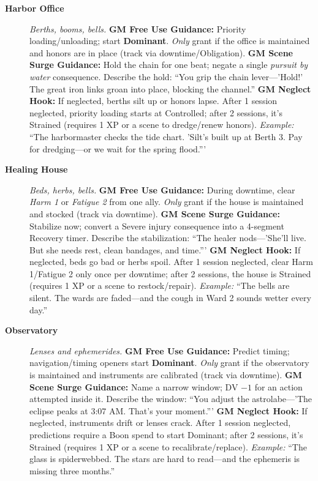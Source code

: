 \begin{description}
  \item[\textbf{Harbor Office}]   
        \emph{Berths, booms, bells.}  
        \textbf{GM Free Use Guidance:} Priority loading/unloading; start \textbf{Dominant}. \emph{Only} grant if the office is maintained and honors are in place (track via downtime/Obligation).  
        \textbf{GM Scene Surge Guidance:} Hold the chain for one beat; negate a single \emph{pursuit by water} consequence. Describe the hold: ``You grip the chain lever---'Hold!' The great iron links groan into place, blocking the channel.''  
        \textbf{GM Neglect Hook:} If neglected, berths silt up or honors lapse. After 1 session neglected, priority loading starts at Controlled; after 2 sessions, it's Strained (requires 1 XP or a scene to dredge/renew honors).  
        \textit{Example:} ``The harbormaster checks the tide chart. 'Silt's built up at Berth 3. Pay for dredging---or we wait for the spring flood.'''  

  \item[\textbf{Healing House}]   
        \emph{Beds, herbs, bells.}  
        \textbf{GM Free Use Guidance:} During downtime, clear \emph{Harm 1} or \emph{Fatigue 2} from one ally. \emph{Only} grant if the house is maintained and stocked (track via downtime).  
        \textbf{GM Scene Surge Guidance:} Stabilize now; convert a Severe injury consequence into a 4-segment Recovery timer. Describe the stabilization: ``The healer nods---'She'll live. But she needs rest, clean bandages, and time.'''  
        \textbf{GM Neglect Hook:} If neglected, beds go bad or herbs spoil. After 1 session neglected, clear Harm 1/Fatigue 2 only once per downtime; after 2 sessions, the house is Strained (requires 1 XP or a scene to restock/repair).  
        \textit{Example:} ``The bells are silent. The wards are faded---and the cough in Ward 2 sounds wetter every day.''  

  \item[\textbf{Observatory}]   
        \emph{Lenses and ephemerides.}  
        \textbf{GM Free Use Guidance:} Predict timing; navigation/timing openers start \textbf{Dominant}. \emph{Only} grant if the observatory is maintained and instruments are calibrated (track via downtime).  
        \textbf{GM Scene Surge Guidance:} Name a narrow window; DV $-1$ for an action attempted inside it. Describe the window: ``You adjust the astrolabe---'The eclipse peaks at 3:07 AM. That's your moment.'''  
        \textbf{GM Neglect Hook:} If neglected, instruments drift or lenses crack. After 1 session neglected, predictions require a Boon spend to start Dominant; after 2 sessions, it's Strained (requires 1 XP or a scene to recalibrate/replace).  
        \textit{Example:} ``The glass is spiderwebbed. The stars are hard to read---and the ephemeris is missing three months.''  


\end{description}
